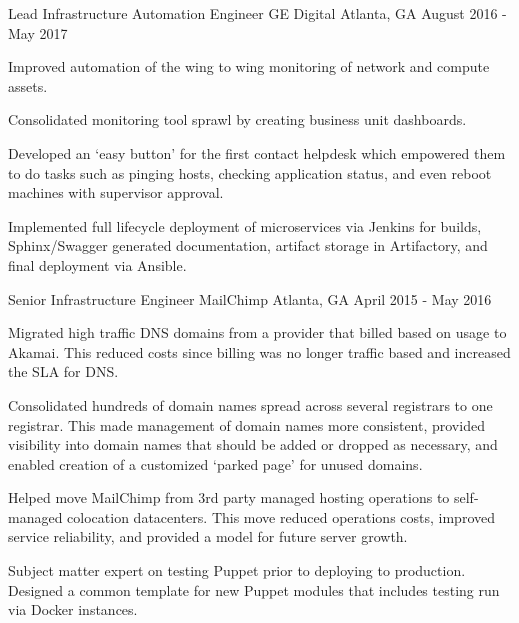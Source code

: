 \begin{cventries}
  \cventry
    {Lead Infrastructure Automation Engineer} %
    {GE Digital} %
    {Atlanta, GA} %
    {August 2016 - May 2017} %
    {
      \begin{cvitems} %
        \item {Improved automation of the wing to wing monitoring of network and compute assets.}
        \item {Consolidated monitoring tool sprawl by creating business unit dashboards.}
        \item {Developed an `easy button' for the first contact helpdesk which empowered them to do tasks such as pinging hosts, checking application status, and even reboot machines with supervisor approval.}
        \item {Implemented full lifecycle deployment of microservices via Jenkins for builds, Sphinx/Swagger generated documentation, artifact storage in Artifactory, and final deployment via Ansible.}
      \end{cvitems}
    }

  \cventry
    {Senior Infrastructure Engineer} %
    {MailChimp} %
    {Atlanta, GA} %
    {April 2015 - May 2016} %
    {
      \begin{cvitems} %
        \item {Migrated high traffic DNS domains from a provider that billed based on usage to Akamai. This reduced costs since billing was no longer traffic based and increased the SLA for DNS.}
        \item {Consolidated hundreds of domain names spread across several registrars to one registrar. This made management of domain names more consistent, provided visibility into domain names that should be added or dropped as necessary, and enabled creation of a customized `parked page' for unused domains.}
        \item {Helped move MailChimp from 3rd party managed hosting operations to self-managed colocation datacenters. This move reduced operations costs, improved service reliability, and provided a model for future server growth.}
        \item {Subject matter expert on testing Puppet prior to deploying to production. Designed a common template for new Puppet modules that includes testing run via Docker instances.}
      \end{cvitems}
    }


\end{cventries}
